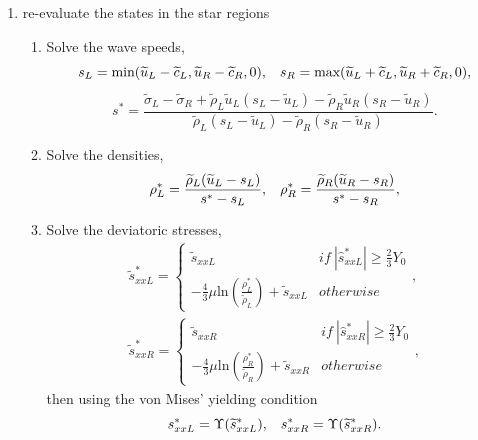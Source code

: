 \documentclass{article}
\numberwithin{equation}{section}
\numberwithin{table}{section}
\begin{document}
\begin{enumerate}
\begin{enumerate}
        \end{enumerate}
  \item re-evaluate the states in the star regions
  \begin{enumerate}
    \item Solve the wave speeds,
\begin{equation*}
  s_L = \text{min} (\widetilde{u}_L-\widetilde{c}_L, \widetilde{u}_R-\widetilde{c}_R,0), \hspace{0.3cm} s_R = \text{max}(\widetilde{u}_L+\widetilde{c}_L, \widetilde{u}_R+\widetilde{c}_R,0),
	\end{equation*}
	\begin{equation*}
	  s^* = \frac{\widetilde{\sigma}_L-\widetilde{\sigma}_R+\widetilde{\rho}_L \widetilde{u}_L(s_L-\widetilde{u}_L)-\widetilde{\rho}_R \widetilde{u}_R(s_R-\widetilde{u}_R)}{\widetilde{\rho}_L(s_L-\widetilde{u}_L)-\widetilde{\rho}_R(s_R-\widetilde{u}_R)}.
\end{equation*}

    \item Solve the densities,
\begin{equation*}
  \rho_L^* = \frac{\widetilde{\rho}_L(\widetilde{u}_L-s_L)}{s^*-s_L}, \hspace{0.3cm}  \rho_R^* = \frac{\widetilde{\rho}_R(\widetilde{u}_R-s_R)}{s^*-s_R},
\end{equation*}

    \item Solve the deviatoric stresses,
 \begin{align*}
   \widetilde{s}_{xxL}^* = \left\{\begin{array}{cc}
                       \widetilde{s}_{xxL} & if \ |\hat{s}_{xxL}^{*}|\geq \frac{2}{3}Y_{0} \\
                        -\frac{4}{3}\mu \text{ln}\left( \frac{\rho_L^*}{\widetilde{\rho}_L}  \right)+\widetilde{s}_{xxL} & otherwise
                     \end{array}\right.
   ,\\
   \widetilde{s}_{xxR}^* =  \left\{\begin{array}{cc}
                       \widetilde{s}_{xxR} & if \ |\hat{s}_{xxR}^{*}| \geq \frac{2}{3}Y_{0} \\
                        -\frac{4}{3}\mu \text{ln}\left( \frac{\rho_R^*}{\widetilde{\rho}_R}  \right)+\widetilde{s}_{xxR} & otherwise
                     \end{array}\right.
    ,
\end{align*}
then using  the von Mises' yielding condition 
\begin{equation*}
  s_{xxL}^* = \Upsilon(\widetilde{s}_{xxL}^*) , \hspace{0.3cm}  s_{xxR}^* = \Upsilon(\widetilde{s}_{xxR}^*).
\end{equation*}


\end{enumerate}
\end{enumerate}
\end{document}
